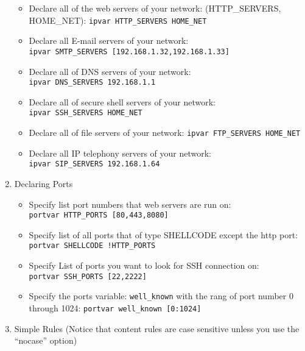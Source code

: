 \documentclass[]{report}
\providecommand{\tightlist}{%
  \setlength{\itemsep}{0pt}\setlength{\parskip}{0pt}}
\begin{document}
\begin{enumerate}
  \begin{itemize}
  \tightlist
  \item
    Declare all of the web servers of your network: (HTTP\_SERVERS,
    HOME\_NET): \texttt{ipvar\ HTTP\_SERVERS\ HOME\_NET}
  \item
    Declare all E-mail servers of your network:
    \texttt{ipvar\ SMTP\_SERVERS\ {[}192.168.1.32,192.168.1.33{]}}
  \item
    Declare all of DNS servers of your network:
    \texttt{ipvar\ DNS\_SERVERS\ 192.168.1.1}
  \item
    Declare all of secure shell servers of your network:
    \texttt{ipvar\ SSH\_SERVERS\ HOME\_NET}
  \item
    Declare all of file servers of your network:
    \texttt{ipvar\ FTP\_SERVERS\ HOME\_NET}
  \item
    Declare all IP telephony servers of your network:
    \texttt{ipvar\ SIP\_SERVERS\ 192.168.1.64}
  \end{itemize}
\item
  Declaring Ports

  \begin{itemize}
  \tightlist
  \item
    Specify list port numbers that web servers are run on:
    \texttt{portvar\ HTTP\_PORTS\ {[}80,443,8080{]}}
  \item
    Specify list of all ports that of type SHELLCODE except the http
    port: \texttt{portvar\ SHELLCODE\ !HTTP\_PORTS}
  \item
    Specify List of ports you want to look for SSH connection on:
    \texttt{portvar\ SSH\_PORTS\ {[}22,2222{]}}
  \item
    Specify the ports variable: \texttt{well\_known} with the rang of
    port number 0 through 1024:
    \texttt{portvar\ well\_known\ {[}0:1024{]}}
  \end{itemize}
\item
  Simple Rules (Notice that content rules are case sensitive unless you
  use the ``nocase'' option)


\end{enumerate}
\end{document}
